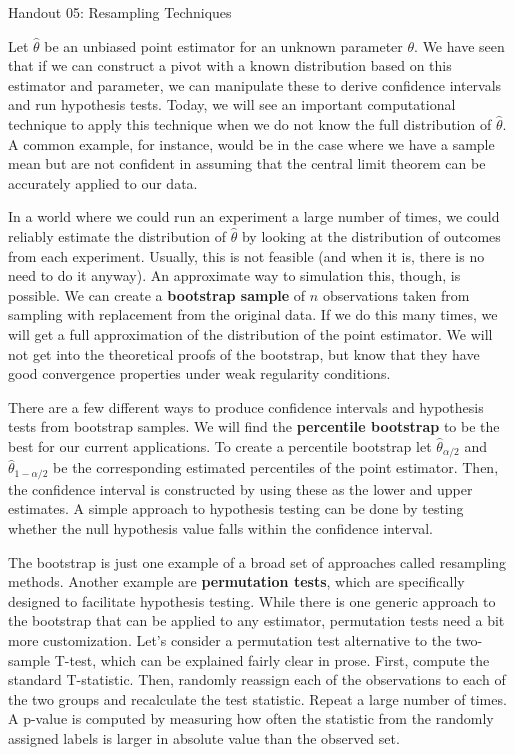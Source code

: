 \documentclass{tufte-handout}
\begin{document}
\justify

{\LARGE Handout 05: Resampling Techniques}

\vspace*{18pt}

\noindent
Let $\hat{\theta}$ be an unbiased point estimator for an unknown parameter
$\theta$. We have seen that if we can construct a pivot with a known
distribution based on this estimator and parameter, we can manipulate
these to derive confidence intervals and run hypothesis tests. Today, we
will see an important computational technique to apply this technique
when we do not know the full distribution of $\hat{\theta}$. A common
example, for instance, would be in the case where we have a sample mean
but are not confident in assuming that the central limit theorem can be
accurately applied to our data.

In a world where we could run an experiment a large number of times, we
could reliably estimate the distribution of $\hat{\theta}$ by looking at
the distribution of outcomes from each experiment. Usually, this is not
feasible (and when it is, there is no need to do it anyway). An approximate
way to simulation this, though, is possible. We can create a \textbf{bootstrap
sample} of $n$ observations taken from sampling with replacement from the
original data. If we do this many times, we will get a full approximation
of the distribution of the point estimator. We will not get into the theoretical
proofs of the bootstrap, but know that they have good convergence properties
under weak regularity conditions. 

There are a few different ways to produce confidence intervals and hypothesis
tests from bootstrap samples. We will find the \textbf{percentile bootstrap}
to be the best for our current applications. To create a percentile bootstrap
let $\hat{\theta}_{\alpha/2}$ and $\hat{\theta}_{1-\alpha/2}$ be the corresponding
estimated percentiles of the point estimator. Then, the confidence interval 
is constructed by using these as the lower and upper estimates. A simple approach
to hypothesis testing can be done by testing whether the null hypothesis value
falls within the confidence interval. 

\vspace*{24pt}

\noindent
The bootstrap is just one example of a broad set of approaches called
resampling methods. Another example are \textbf{permutation tests}, which
are specifically designed to facilitate hypothesis testing. While there is
one generic approach to the bootstrap that can be applied to any estimator,
permutation tests need a bit more customization. Let's consider a permutation
test alternative to the two-sample T-test, which can be explained fairly
clear in prose. First, compute the standard T-statistic. Then, randomly
reassign each of the observations to each of the two groups and recalculate
the test statistic. Repeat a large number of times. A p-value is computed by
measuring how often the statistic from the randomly assigned
labels is larger in absolute value than the observed set. 
\end{document}
